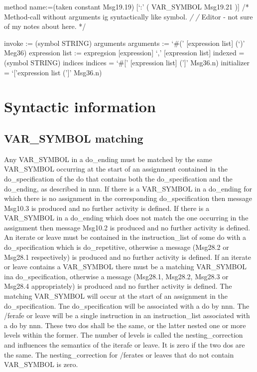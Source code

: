 method name:=(taken constant \textbar{} Msg19.19) {[}`:' ( VAR\_SYMBOL
\textbar{} Msg19.21 ){]} /* Method-call without arguments ig
syntactically like symbol. \emph{/ /} Editor - not sure of my notes
about here. */

invoke := (symbol \textbar{} STRING) arguments arguments := `\#('
{[}expression list{]} (`)' \textbar{} Meg36) expression list :=
expregsion \textbar{} {[}expression{]} `,' {[}expression list{]} indexed
= (symbol \textbar{} STRING) indices indices = `\#{[}' {[}expression
list{]} ('{]}' \textbar{} Msg36.n) initializer = `{[}'expression list
('{]}' \textbar{} Msg36.n)

\section{Syntactic information}\label{syntactic-information}

\subsection{VAR\_SYMBOL matching}\label{var_symbol-matching}

Any VAR\_SYMBOL in a do\_ending must be matched by the same VAR\_SYMBOL
occurring at the start of an assignment contained in the
do\_specification of the do that contains both the do\_specification and
the do\_ending, as described in nnn. If there is a VAR\_SYMBOL in a
do\_ending for which there is no assignment in the corresponding
do\_specification then message Msg10.3 is produced and no further
activity is defined. If there is a VAR\_SYMBOL in a do\_ending which
does not match the one occurring in the assignment then message Msg10.2
is produced and no further activity is defined. An iterate or leave must
be contained in the instruction\_list of some do with a
do\_specification which is do\_repetitive, otherwise a message (Msg28.2
or Msg28.1 respectively) is produced and no further activity is defined.
If an iterate or leave contains a VAR\_SYMBOL there must be a matching
VAR\_SYMBOL ina do\_specification, otherwise a message (Msg28.1,
Msg28.2, Msg28.3 or Msg28.4 appropriately) is produced and no further
activity is defined. The matching VAR\_SYMBOL will occur at the start of
an assignment in the do\_specification. Tne do\_specification will be
associated with a do by nnn. The /ferafe or leave will be a single
instruction in an instruction\_list associated with a do by nnn. These
two dos shall be the same, or the latter nested one or more levels
within the former. The number of levels is called the
nesting\_correction and influences the semantics of the iterafe or
leave. It is zero if the two dos are the same. The nesting\_correction
for /ferates or leaves that do not contain VAR\_SYMBOL is zero.

